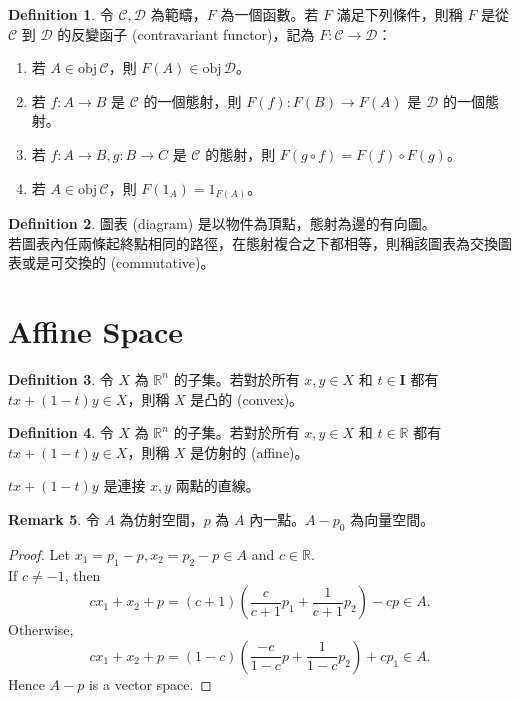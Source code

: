 \documentclass[12pt]{article}
\theoremstyle{definition}
\newtheorem{definition}{Definition}[section]
\newtheorem{remark}[definition]{Remark}
\newcommand\<{\langle}
\renewcommand\>{\rangle}
\newcommand\obj{\mathrm{obj}\hspace{2pt}}
\begin{document}
\begin{CJK}{UTF8}{bsmi}
\begin{definition}
    令 $\mathcal{C}, \mathcal{D}$ 為範疇，$F$ 為一個函數。若 $F$ 滿足下列條件，則稱 $F$ 是從 $\mathcal{C}$ 到 $\mathcal{D}$ 的反變函子 (contravariant functor)，記為 $F:\mathcal{C}\to\mathcal{D}$：
    \begin{enumerate}
        \item 若 $A\in\obj\mathcal{C}$，則 $F(A)\in\obj\mathcal{D}$。
        \item 若 $f:A\to B$ 是 $\mathcal{C}$ 的一個態射，則 $F(f):F(B)\to F(A)$ 是 $\mathcal{D}$ 的一個態射。
        \item 若 $f:A\to B, g:B\to C$ 是 $\mathcal{C}$ 的態射，則 $F(g\circ f)=F(f)\circ F(g)$。
        \item 若 $A\in\obj\mathcal{C}$，則 $F(1_A)=1_{F(A)}$。
    \end{enumerate}
\end{definition}

\begin{definition}
    圖表 (diagram) 是以物件為頂點，態射為邊的有向圖。 \\
    若圖表內任兩條起終點相同的路徑，在態射複合之下都相等，則稱該圖表為交換圖表或是可交換的 (commutative)。
\end{definition}

\section{Affine Space}

\begin{definition}
    令 $X$ 為 $\mathbb{R}^n$ 的子集。若對於所有 $x, y\in X$ 和 $t\in\textbf{I}$ 都有 $tx+(1-t)y\in X$，則稱 $X$ 是凸的 (convex)。
\end{definition}

\begin{definition}
    令 $X$ 為 $\mathbb{R}^n$ 的子集。若對於所有 $x, y\in X$ 和 $t\in\mathbb{R}$ 都有 $tx+(1-t)y\in X$，則稱 $X$ 是仿射的 (affine)。
\end{definition}

$tx+(1-t)y$ 是連接 $x, y$ 兩點的直線。

\begin{remark}
    令 $A$ 為仿射空間，$p$ 為 $A$ 內一點。$A-p_0$ 為向量空間。
\end{remark}
\begin{proof}
    Let $x_1=p_1-p, x_2=p_2-p\in A$ and $c\in\mathbb{R}$. \\
    If $c\ne-1$, then
    \[
        cx_1+x_2+p
         = (c+1)\left(\frac{c}{c+1}p_1+\frac{1}{c+1}p_2\right)-cp
         \in A.
    \]
    Otherwise,
    \[
        cx_1+x_2+p
         = (1-c)\left(\frac{-c}{1-c}p+\frac{1}{1-c}p_2\right)+cp_1
         \in A.
    \]
    Hence $A-p$ is a vector space.
\end{proof}


\end{CJK}
\end{document}

